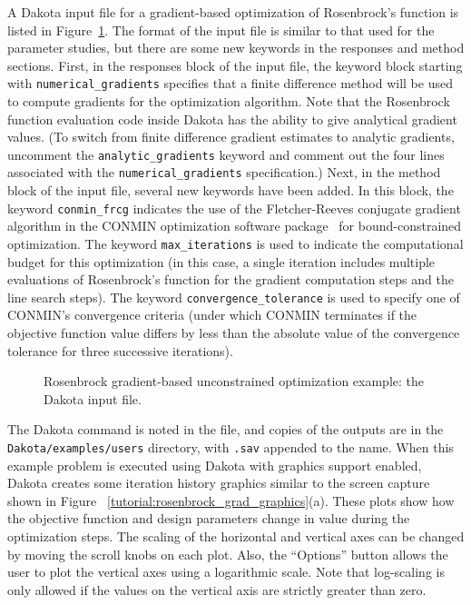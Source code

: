 A Dakota input file for a gradient-based optimization of Rosenbrock's
function is listed in Figure~\ref{tutorial:rosenbrock_grad}. The
format of the input file is similar to that used for the parameter
studies, but there are some new keywords in the responses and method
sections. First, in the responses block of the input file, the
keyword block starting with \texttt{numerical\_gradients} specifies
that a finite difference method will be used to compute gradients for
the optimization algorithm. Note that the Rosenbrock function
evaluation code inside Dakota has the ability to give analytical
gradient values. (To switch from finite difference gradient estimates
to analytic gradients, uncomment the \texttt{analytic\_gradients}
keyword and comment out the four lines associated with the
\texttt{numerical\_gradients} specification.)
Next, in the method
block of the input file, several new keywords have been added. In
this block, the keyword \texttt{conmin\_frcg} indicates the use of
the Fletcher-Reeves conjugate gradient algorithm in the CONMIN
optimization software package~\cite{Van78} for bound-constrained
optimization. The keyword \texttt{max\_iterations} is used to
indicate the computational budget for this optimization (in this case,
a single iteration includes multiple evaluations of Rosenbrock's
function for the gradient computation steps and the line search
steps). The keyword \texttt{convergence\_tolerance} is used to specify
one of CONMIN's convergence criteria (under which CONMIN terminates if the
objective function value differs by less than the absolute value of
the convergence tolerance for three successive iterations).

\begin{figure}
  \centering
  \begin{bigbox}
    \begin{small}
    \end{small}
  \end{bigbox}
  \caption{Rosenbrock gradient-based unconstrained optimization
  example: the Dakota input file.}
  \label{tutorial:rosenbrock_grad}
\end{figure}

The Dakota command is noted in the file, and copies of the outputs
are in the \texttt{Dakota/examples/users} directory, with \texttt{.sav}
appended to the name.  When this example problem is executed using
Dakota with graphics support enabled, Dakota creates some iteration
history graphics similar to the screen capture shown in Figure~
\ref{tutorial:rosenbrock_grad_graphics}(a). These plots show how the
objective function and design parameters change in value during the
optimization steps. The scaling of the horizontal and vertical axes
can be changed by moving the scroll knobs on each plot.  Also, the
``Options'' button allows the user to plot the vertical axes using a
logarithmic scale. Note that log-scaling is only allowed if the values
on the vertical axis are strictly greater than zero.

